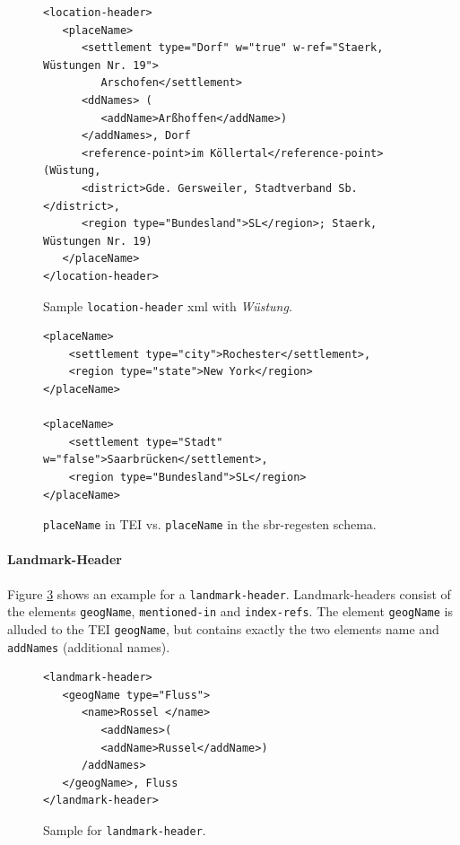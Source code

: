 \begin{figure}[H]
\centering
\begin{verbatim}
<location-header>
   <placeName>
      <settlement type="Dorf" w="true" w-ref="Staerk, Wüstungen Nr. 19">
         Arschofen</settlement>
      <ddNames> (
         <addName>Arßhoffen</addName>)
      </addNames>, Dorf 
      <reference-point>im Köllertal</reference-point> (Wüstung, 
      <district>Gde. Gersweiler, Stadtverband Sb.</district>, 
      <region type="Bundesland">SL</region>; Staerk, Wüstungen Nr. 19) 
   </placeName>
</location-header>
\end{verbatim}
\label{fig:location-wuest-xml}
\caption{Sample \texttt{location-header} xml with \textit{Wüstung}.}
\end{figure}

\begin{figure}[H]
\centering
\begin{verbatim}
<placeName>
    <settlement type="city">Rochester</settlement>,
    <region type="state">New York</region>
</placeName>

<placeName>
    <settlement type="Stadt" w="false">Saarbrücken</settlement>,
    <region type="Bundesland">SL</region>
</placeName>
\end{verbatim}
\label{fig:placeName}
\caption{\texttt{placeName} in TEI vs. \texttt{placeName} in the sbr-regesten schema.}
\end{figure}


\paragraph{Landmark-Header}
Figure \ref{fig:landmark-header-xml} shows an example for a \texttt{landmark-header}. Landmark-headers consist of the elements \texttt{geogName}, \texttt{mentioned-in} and \texttt{index-refs}. The element \texttt{geogName} is alluded to the TEI \texttt{geogName}, but contains exactly the two elements name and \texttt{addNames} (additional names).

\begin{figure}[H]
\centering
\begin{verbatim}
<landmark-header>
   <geogName type="Fluss">
      <name>Rossel </name>
         <addNames>(
         <addName>Russel</addName>)
      /addNames>
   </geogName>, Fluss 
</landmark-header>
\end{verbatim}
\label{fig:landmark-header-xml}
\caption{Sample for \texttt{landmark-header}.}
\end{figure}

